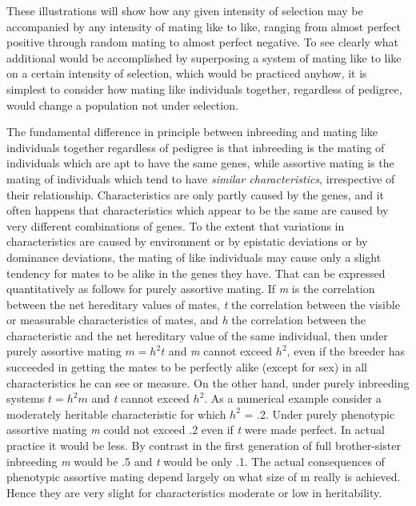 These illustrations will show how any given intensity of selection
may be accompanied by any intensity of mating like to like, ranging
from almost perfect positive through random mating to almost perfect
negative. To see clearly what additional would be accomplished by
superposing a system of mating like to like on a certain intensity of
selection, which would be practiced anyhow, it is simplest to consider
how mating like individuals together, regardless of pedigree, would
change a population not under selection.

The fundamental difference in principle between inbreeding and mating
like individuals together regardless of pedigree is that inbreeding is
the mating of individuals which are apt to have the same genes, while
assortive mating is the mating of individuals which tend to have
\textit{similar characteristics}, irrespective of their relationship.
Characteristics are only partly caused by the genes, and it often
happens that characteristics which appear to be the same are caused by
very different combinations of genes. To the extent that variations in
characteristics are caused by environment or by epistatic deviations
or by dominance deviations, the mating of like individuals may cause
only a slight tendency for mates to be alike in the genes they have.
That can be expressed quantitatively as follows for purely assortive
mating. If \textit{m} is the correlation between the net hereditary
values of mates, \textit{t} the correlation between the visible or
measurable characteristics of mates, and \textit{h} the correlation
between the characteristic and the net hereditary value of the same
individual, then under purely assortive mating $m = h^2t$ and
\textit{m} cannot exceed $h^2$, even if the breeder has succeeded in
getting the mates to be perfectly alike (except for sex) in all
characteristics he can see or measure. On the other hand, under
purely inbreeding systems $t = h^2m$ and \textit{t} cannot exceed
$h^2$. As a numerical example consider a moderately heritable
characteristic for which $h^2$ = .2. Under purely phenotypic
assortive mating \textit{m} could not exceed .2 even if \textit{t}
were made perfect. In actual practice it would be less. By
contrast in the first generation of full brother-sister inbreeding
\textit{m} would be .5 and \textit{t} would be only .1. The actual
consequences of phenotypic assortive mating depend largely on what
size of m really is achieved. Hence they are very slight for
characteristics moderate or low in heritability.

